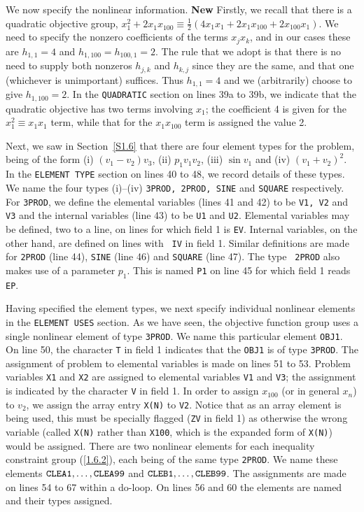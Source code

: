 \documentclass[a4paper]{article}
\newcommand{\req}[1]{(\ref{#1})}
\newcommand{\sfrac}[2]{{\scriptstyle \frac{#1}{#2}}}
\newcommand{\half}{\sfrac{1}{2}}
\begin{document}
We now specify the nonlinear information. {\bf New} Firstly, we recall that
there is a quadratic objective group,
$x_1^2 + 2 x_1^{ } x_{100}^{ } \equiv \half( 4 x_1 x_1 +
 2 x_1 x_{100} + 2 x_{100} x_1 )$. We need to specify the nonzero coefficients
of the terms $x_j x_k$, and in our cases these are
$h_{1,1} = 4$ and $h_{1,100} = h_{100,1} = 2$.
The rule that we adopt is
that there is no need to supply both nonzeros
$h_{j,k}$ and $h_{k,j}$ since they are the same, and
that one (whichever is unimportant) suffices. Thus $h_{1,1} = 4$
and we (arbitrarily) choose to give $h_{1,100} = 2$.
In the {\tt QUADRATIC} section on lines 39a to 39b, we indicate that
the quadratic objective has two terms involving
${x_1}$; the coefficient 4 is given for the
${x_1^2 \equiv x_1^{ } x_1^{ }}$ term, while that for
the ${x_1 x_{100}}$ term is assigned the value 2.

Next, we saw in Section~\ref{S1.6}
that there are four element types
for  the problem, being of  the form
(i) $(v_1 - v_2 ) v_3$, (ii) $p_1 v_1 v_2$, (iii) $\sin v_1$  and (iv)
$(v_1 + v_2  )^2$.  In  the {\tt ELEMENT  TYPE}
section on lines 40 to 48, we record details  of these types.  We name
the four  types (i)--(iv) {\tt 3PROD,  2PROD, SINE}  and  {\tt SQUARE}
respectively.   For  {\tt 3PROD},  we define  the elemental  variables
(lines 41  and 42) to be {\tt  V1, V2}  and {\tt V3}  and the internal
variables (line 43) to be {\tt U1} and  {\tt U2}.  Elemental variables
may be defined, two to a line, on lines for which field 1 is {\tt EV}.
Internal variables,
on the other hand, are defined on lines  with {\tt
IV}  in field 1.  Similar definitions  are  made for {\tt 2PROD} (line
44), {\tt SINE} (line 46)  and {\tt  SQUARE} (line  47). The type {\tt
2PROD} also makes use of a parameter $p_1$. This is named {\tt  P1}
on line 45 for which field 1 reads {\tt EP}.

Having   specified the  element  types,
we  next   specify individual
nonlinear elements
in the {\tt  ELEMENT USES}
section.  As we have seen, the objective function
group uses  a single
nonlinear element of type
{\tt 3PROD}. We name this particular element
{\tt OBJ1}.  On line 50,  the character {\tt  T}  in field 1 indicates
that the {\tt OBJ1} is of type  {\tt 3PROD}. The assignment of problem
to  elemental variables
is made on  lines  51 to 53. Problem variables
{\tt X1} and {\tt X2} are assigned to elemental variables {\tt V1} and
{\tt V3}; the assignment  is  indicated by the   character {\tt V}  in
field 1.  In order to assign $x_{100}$ (or in general $x_n$) to $v_2$,
we assign the array
entry {\tt X(N)}  to {\tt  V2}. Notice  that as an
array element is being used, this must be specially flagged  ({\tt ZV}
in field 1) as otherwise the wrong variable (called {\tt  X(N)} rather
than {\tt X100}, which is  the expanded form of  {\tt X(N)}) would be
assigned.   There are two   nonlinear  elements
for   each inequality
constraint group
\req{1.6.2}, each being of  the same type  {\tt 2PROD}. We  name these
elements
${\tt   CLEA1,\ldots,  CLEA99}$  and    ${\tt  CLEB1,\ldots,
CLEB99}$. The assignments are made on lines 54 to 67 within a do-loop.
On lines 56 and 60  the elements are named
and their  types assigned.
\end{document}
